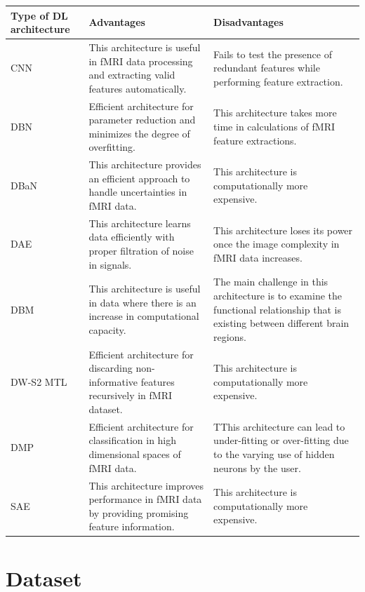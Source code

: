 \documentclass{article}
\begin{document}
\begin{center}
\begin{tabularx}{0.8\textwidth} { 
  | >{\raggedright\arraybackslash}X 
  | >{\centering\arraybackslash}X 
  | >{\raggedleft\arraybackslash}X | }
 \hline
 Type of DL
architecture & Advantages & Disadvantages\\
 \hline
 CNN  & This architecture is useful in
fMRI data processing and
extracting valid features
automatically.  & 
Fails to test the presence of redundant
features while performing feature
extraction.\\
\hline
 DBN & Efficient architecture for
parameter reduction and
minimizes the degree of overfitting. & This architecture takes more time in
calculations of fMRI feature extractions.\\
 \hline
 DBaN  & This architecture provides an
efficient approach to handle
uncertainties in fMRI data.  & This architecture is computationally more
expensive.\\
\hline
 DAE  & This architecture learns data
efficiently with proper
filtration of noise in signals. & This architecture loses its power once the
image complexity in fMRI data
increases.\\
\hline
 DBM  & This architecture is useful in
data where there is an
increase in computational
capacity. & The main challenge in this architecture is
to examine the functional relationship
that is existing between different brain
regions.\\
\hline
 DW-S2 MTL & Efficient architecture for
discarding non-informative
features recursively in fMRI
dataset. & This architecture is computationally more
expensive.\\
\hline
 DMP  & Efficient architecture for
classification in high
dimensional spaces of fMRI
data. & TThis architecture can lead to under-fitting
or over-fitting due to the varying use of
hidden neurons by the user.\\
\hline
 SAE  & This architecture improves
performance in fMRI data by
providing promising feature
information. & This architecture is computationally more
expensive.\\
 \hline


\end{tabularx}
\end{center}


\section{Dataset}
\end{document}
